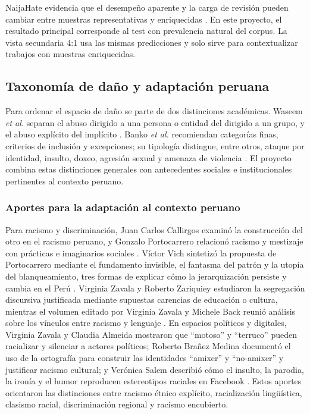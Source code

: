 NaijaHate evidencia que el desempeño aparente y la carga de revisión pueden cambiar entre muestras representativas y enriquecidas \cite{tonneau2024naijahate}. En este proyecto, el resultado principal corresponde al test con prevalencia natural del corpus. La vista secundaria 4:1 usa las mismas predicciones y solo sirve para contextualizar trabajos con muestras enriquecidas.

\subsection{Taxonomía de daño y adaptación peruana}

Para ordenar el espacio de daño se parte de dos distinciones académicas. Waseem \emph{et al.} separan el abuso dirigido a una persona o entidad del dirigido a un grupo, y el abuso explícito del implícito \cite{waseem2017abuse}. Banko \emph{et al.} recomiendan categorías finas, criterios de inclusión y excepciones; su tipología distingue, entre otros, ataque por identidad, insulto, doxeo, agresión sexual y amenaza de violencia \cite{banko2020taxonomy}. El proyecto combina estas distinciones generales con antecedentes sociales e institucionales pertinentes al contexto peruano.

\subsubsection{Aportes para la adaptación al contexto peruano}

Para racismo y discriminación, Juan Carlos Callirgos examinó la construcción del otro en el racismo peruano, y Gonzalo Portocarrero relacionó racismo y mestizaje con prácticas e imaginarios sociales \cite{callirgos1993racismo,portocarrero2009racismo}. Víctor Vich sintetizó la propuesta de Portocarrero mediante el fundamento invisible, el fantasma del patrón y la utopía del blanqueamiento, tres formas de explicar cómo la jerarquización persiste y cambia en el Perú \cite{vich2018dinamicas}. Virginia Zavala y Roberto Zariquiey estudiaron la segregación discursiva justificada mediante supuestas carencias de educación o cultura, mientras el volumen editado por Virginia Zavala y Michele Back reunió análisis sobre los vínculos entre racismo y lenguaje \cite{zavala2007discurso,zavala2017racismo}. En espacios políticos y digitales, Virginia Zavala y Claudia Almeida mostraron que ``motoso'' y ``terruco'' pueden racializar y silenciar a actores políticos; Roberto Brañez Medina documentó el uso de la ortografía para construir las identidades ``amixer'' y ``no-amixer'' y justificar racismo cultural; y Verónica Salem describió cómo el insulto, la parodia, la ironía y el humor reproducen estereotipos raciales en Facebook \cite{almeida2022motoso,branez2012amixer,salem2016amixer}. Estos aportes orientaron las distinciones entre racismo étnico explícito, racialización lingüística, clasismo racial, discriminación regional y racismo encubierto.

